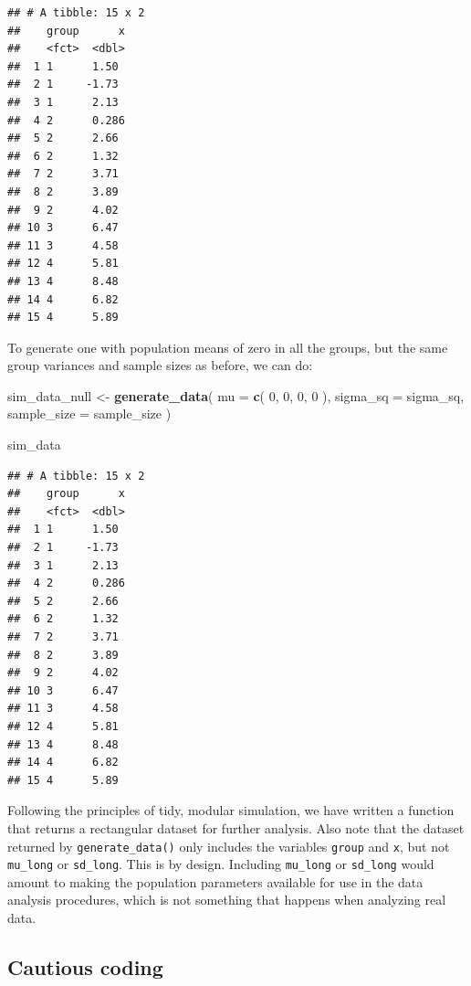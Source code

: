\documentclass[
]{book}
\newenvironment{Shaded}{\begin{snugshade}}{\end{snugshade}}
\newcommand{\AttributeTok}[1]{\textcolor[rgb]{0.13,0.29,0.53}{#1}}
\newcommand{\DecValTok}[1]{\textcolor[rgb]{0.00,0.00,0.81}{#1}}
\newcommand{\FunctionTok}[1]{\textcolor[rgb]{0.13,0.29,0.53}{\textbf{#1}}}
\newcommand{\NormalTok}[1]{#1}
\newcommand{\OtherTok}[1]{\textcolor[rgb]{0.56,0.35,0.01}{#1}}
\begin{document}
\begin{verbatim}
## # A tibble: 15 x 2
##    group      x
##    <fct>  <dbl>
##  1 1      1.50 
##  2 1     -1.73 
##  3 1      2.13 
##  4 2      0.286
##  5 2      2.66 
##  6 2      1.32 
##  7 2      3.71 
##  8 2      3.89 
##  9 2      4.02 
## 10 3      6.47 
## 11 3      4.58 
## 12 4      5.81 
## 13 4      8.48 
## 14 4      6.82 
## 15 4      5.89
\end{verbatim}

To generate one with population means of zero in all the groups, but the same group variances and sample sizes as before, we can do:

\begin{Shaded}
\begin{Highlighting}[]
\NormalTok{sim\_data\_null }\OtherTok{\textless{}{-}} \FunctionTok{generate\_data}\NormalTok{(}
  \AttributeTok{mu =} \FunctionTok{c}\NormalTok{( }\DecValTok{0}\NormalTok{, }\DecValTok{0}\NormalTok{, }\DecValTok{0}\NormalTok{, }\DecValTok{0}\NormalTok{ ),}
  \AttributeTok{sigma\_sq =}\NormalTok{ sigma\_sq, }
  \AttributeTok{sample\_size =}\NormalTok{ sample\_size}
\NormalTok{)}

\NormalTok{sim\_data}
\end{Highlighting}
\end{Shaded}

\begin{verbatim}
## # A tibble: 15 x 2
##    group      x
##    <fct>  <dbl>
##  1 1      1.50 
##  2 1     -1.73 
##  3 1      2.13 
##  4 2      0.286
##  5 2      2.66 
##  6 2      1.32 
##  7 2      3.71 
##  8 2      3.89 
##  9 2      4.02 
## 10 3      6.47 
## 11 3      4.58 
## 12 4      5.81 
## 13 4      8.48 
## 14 4      6.82 
## 15 4      5.89
\end{verbatim}

Following the principles of tidy, modular simulation, we have written a function that returns a rectangular dataset for further analysis.
Also note that the dataset returned by \texttt{generate\_data()} only includes the variables \texttt{group} and \texttt{x}, but not \texttt{mu\_long} or \texttt{sd\_long}.
This is by design.
Including \texttt{mu\_long} or \texttt{sd\_long} would amount to making the population parameters available for use in the data analysis procedures, which is not something that happens when analyzing real data.

\subsection{Cautious coding}\label{cautious-coding}
\end{document}
